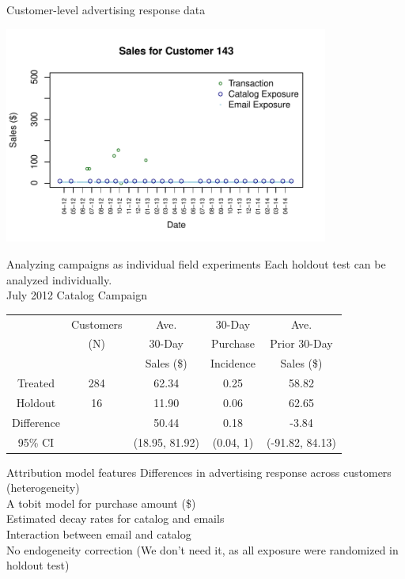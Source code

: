 \documentclass[10pt, aspectratio=169]{beamer}
\begin{document}
\begin{frame}{Customer-level advertising response data}
\begin{center}
\includegraphics[width=0.8\textwidth]{images/cust_143.pdf} \\
\end{center}
\end{frame}

\begin{frame}{Analyzing campaigns as individual field experiments}
Each holdout test can be analyzed individually.\\
\bigskip
\footnotesize
July 2012 Catalog Campaign
\begin{center}
\begin{tabular}{ccccc}
  \hline
 & Customers  & Ave.  & 30-Day  & Ave. \\ 
 & (N) & 30-Day & Purchase & Prior 30-Day \\
 & & Sales (\$) & Incidence & Sales (\$) \\
  \hline
 Treated & 284 & 62.34 & 0.25 & 58.82 \\ 
  Holdout &  16 & 11.90 & 0.06 & 62.65 \\ 
  \hline
  Difference &  & 50.44 & 0.18 & -3.84 \\ 
  95\% CI &  & (18.95, 81.92) & (0.04, 1) & (-91.82, 84.13) \\ 
   \hline
\end{tabular}
\end{center}
\end{frame}

\begin{frame}{Attribution model features}
Differences in advertising response across customers (heterogeneity)\\
\bigskip
A tobit model for purchase amount (\$) \\
\bigskip
Estimated decay rates for catalog and emails\\
\bigskip
Interaction between email and catalog\\
\bigskip
No endogeneity correction (We don't need it, as all exposure were randomized in holdout test)
\end{frame}
\end{document}
